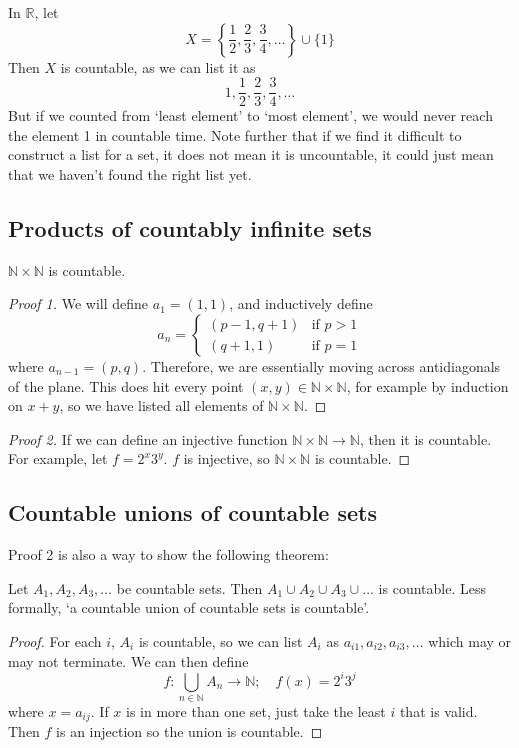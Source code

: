 \begin{remark}
	In \(\mathbb R\), let
	\[
		X = \left\{ \frac{1}{2}, \frac{2}{3}, \frac{3}{4}, \dots \right\} \cup \{ 1 \}
	\]
	Then \(X\) is countable, as we can list it as
	\[
		1, \frac{1}{2}, \frac{2}{3}, \frac{3}{4}, \dots
	\]
	But if we counted from `least element' to `most element', we would never reach the element 1 in countable time.
	Note further that if we find it difficult to construct a list for a set, it does not mean it is uncountable, it could just mean that we haven't found the right list yet.
\end{remark}

\subsection{Products of countably infinite sets}
\begin{theorem}
	\(\mathbb N \times \mathbb N\) is countable.
\end{theorem}
\begin{proof}[Proof 1]
	We will define \(a_1 = (1, 1)\), and inductively define
	\[
		a_n = \begin{cases}
			(p-1, q+1) & \text{if } p > 1 \\
			(q+1, 1)   & \text{if } p = 1
		\end{cases}
	\]
	where \(a_{n-1} = (p, q)\).
	Therefore, we are essentially moving across antidiagonals of the plane.
	This does hit every point \((x, y) \in \mathbb N \times \mathbb N\), for example by induction on \(x+y\), so we have listed all elements of \(\mathbb N \times \mathbb N\).
\end{proof}
\begin{proof}[Proof 2]
	If we can define an injective function \(\mathbb N \times \mathbb N \to \mathbb N\), then it is countable.
	For example, let \(f = 2^x 3^y\).
	\(f\) is injective, so \(\mathbb N \times \mathbb N\) is countable.
\end{proof}

\subsection{Countable unions of countable sets}
Proof 2 is also a way to show the following theorem:
\begin{theorem}
	Let \(A_1, A_2, A_3, \dots\) be countable sets.
	Then \(A_1 \cup A_2 \cup A_3 \cup \dots\) is countable.
	Less formally, `a countable union of countable sets is countable'.
\end{theorem}
\begin{proof}
	For each \(i\), \(A_i\) is countable, so we can list \(A_i\) as \(a_{i1}, a_{i2}, a_{i3}, \dots\) which may or may not terminate.
	We can then define
	\[
		f\colon \bigcup_{n \in \mathbb N}A_n \to \mathbb N;\quad f(x) = 2^i 3^j
	\]
	where \(x = a_{ij}\).
	If \(x\) is in more than one set, just take the least \(i\) that is valid.
	Then \(f\) is an injection so the union is countable.
\end{proof}

